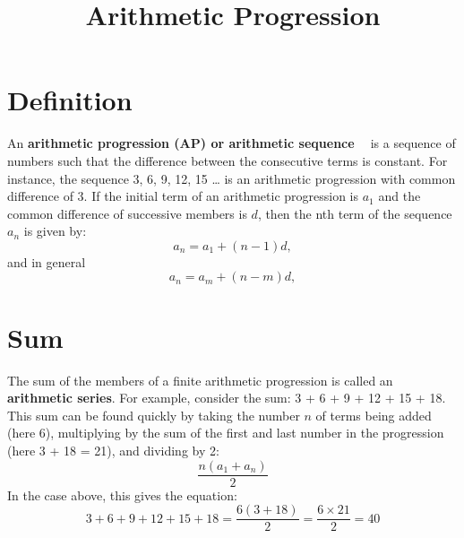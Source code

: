 \documentclass{article}
\title{Arithmetic Progression}
\date{}
\begin{document}

\maketitle
\date{}
\section*{Definition}
An \textbf{arithmetic progression (AP) or arithmetic sequence ~\cite{ap-wiki}} is a sequence of numbers such that the difference between the consecutive terms is constant. For instance, the sequence 3, 6, 9, 12, 15 … is an arithmetic progression with common difference of 3.\newline
If the initial term of an arithmetic progression is ${a_1}$ and the common difference of successive members is $d$, then the nth term of the sequence ${a_n}$ is given by:
\begin{equation*}
a_n = a_1 + (n - 1)d,
\end{equation*}
and in general
\begin{equation*}
a_n = a_m + (n - m	)d,
\end{equation*}
\section*{Sum}	
The sum of the members of a finite arithmetic progression is called an \textbf{arithmetic series}. For example, consider the sum:
3 + 6 + 9 + 12 + 15 + 18.
This sum can be found quickly by taking the number $n$ of terms being added (here 6), multiplying by the sum of the first and last number in the progression (here 3 + 18 = 21), and dividing by 2:\newline
\begin{equation*}
\frac{n(a_1 + a_n)}{2}
\end{equation*}\newline
In the case above, this gives the equation:\newline
\begin{equation*}
3 + 6 + 9 + 12 + 15 + 18 = \frac{6(3 + 18)}{2} = \frac{6 \times 21}{2} = 40
\end{equation*}
\end{document}
